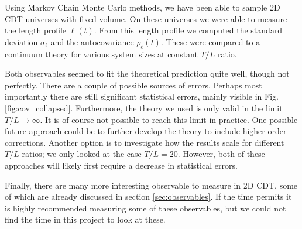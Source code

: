 Using Markov Chain Monte Carlo methods, we have been able to sample 2D CDT universes with fixed volume. On these universes we were able to measure the length profile $\ell(t)$. From this length profile we computed the standard deviation $\sigma_\ell$ and the autocovariance $\rho_\ell(t)$. These were compared to a continuum theory for various system sizes at constant $T/L$ ratio.

Both observables seemed to fit the theoretical prediction quite well, though not perfectly. There are a couple of possible sources of errors. Perhaps most importantly there are still significant statistical errors, mainly visible in Fig. \ref{fig:cov_collapsed}. Furthermore, the theory we used is only valid in the limit $T/L \to \infty$. It is of course not possible to reach this limit in practice. One possible future approach could be to further develop the theory to include higher order corrections. Another option is to investigate how the results scale for different $T/L$ ratios; we only looked at the case $T/L = 20$. However, both of these approaches will likely first require a decrease in statistical errors.

Finally, there are many more interesting observable to measure in 2D CDT, some of which are already discussed in section \ref{sec:observables}.
If the time permits it is highly recommended measuring some of these observables, but we could not find the time in this project to look at these.